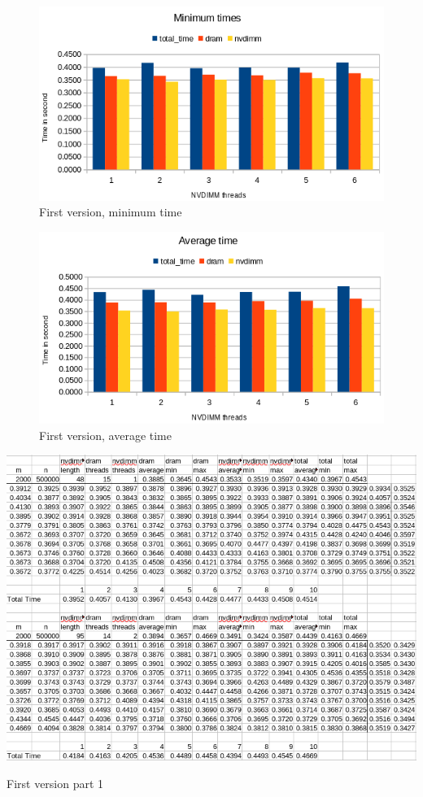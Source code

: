 \documentclass[12pt,a4paper,USenglish]{article}      %
\begin{document}
\begin{figure}[!hbtp]
\includegraphics[scale=0.7]{Large_Array_test/First_version_v3_figur_2.png}
\caption{First version, minimum time}
\end{figure}

\begin{figure}[!hbtp]
\includegraphics[scale=0.7]{Large_Array_test/First_version_v3_figur_3.png}
\caption{First version, average time}
\end{figure}


\begin{table}[!hbtp]
\includegraphics[scale=0.6]{Large_Array_test/Large_array_test_first_version_v3_part1.png}
\caption{First version part 1}
\end{table}
\end{document}
